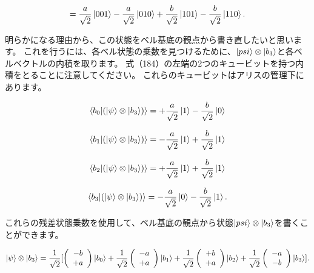 \begin{equation}
\label{184}
= \frac{a}{\sqrt{2}} \ket{001} -\frac{a}{\sqrt{2}} \ket{010} + \frac{b}{\sqrt{2}} \ket{101} -\frac{b}{\sqrt{2}} \ket{110} .
\end{equation}

明らかになる理由から、この状態をベル基底の観点から書き直したいと思います。 これを行うには、各ベル状態の乗数を見つけるために、$\ket{psi} \otimes \ket{b_3}$と各ベルベクトルの内積を取ります。 式（184）の左端の2つのキュービットを持つ内積をとることに注意してください。 これらのキュービットはアリスの管理下にあります。

\begin{equation}
\label{185}
\braket{b_0 | (\ket{\psi} \otimes \ket{b_3})}
=
+ \frac{a}{\sqrt{2}}\ket{1} - \frac{b}{\sqrt{2}}\ket{0} 
\end{equation}

\begin{equation}
\label{186}
\braket{b_1 | (\ket{\psi} \otimes \ket{b_3})}
=
- \frac{a}{\sqrt{2}}\ket{1} + \frac{b}{\sqrt{2}}\ket{1} 
\end{equation}

\begin{equation}
\label{187}
\braket{b_2 | (\ket{\psi} \otimes \ket{b_3})}
=
+ \frac{a}{\sqrt{2}}\ket{1} + \frac{b}{\sqrt{2}}\ket{1} 
\end{equation}

\begin{equation}
\label{188}
\braket{b_3 | (\ket{\psi} \otimes \ket{b_3})}
=
- \frac{a}{\sqrt{2}}\ket{0} - \frac{b}{\sqrt{2}}\ket{1}.
\end{equation}

これらの残差状態乗数を使用して、ベル基底の観点から状態$\ket{psi} \otimes \ket{b_3}$を書くことができます。

\begin{equation}
\label{189}
\ket{\psi} \otimes \ket{b_3}
=
\frac{1}{\sqrt{2}}
[ 
\left( \begin{array}{c}
 -b \\
 +a
\end{array} \right)  \ket{b_0}
+
\frac{1}{\sqrt{2}}
\left( \begin{array}{c}
 -a \\
 +a
\end{array} \right)  \ket{b_1}
+
\frac{1}{\sqrt{2}}
\left( \begin{array}{c}
 +b \\
 +a
\end{array} \right)  \ket{b_2}
+
\frac{1}{\sqrt{2}}
\left( \begin{array}{c}
 -a \\
 -b
\end{array} \right)  \ket{b_3} ].
\end{equation}

